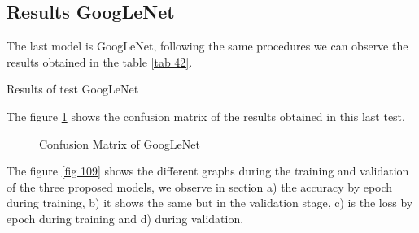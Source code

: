 \documentclass[letterpaper,12pt,openright,oneside]{article}
\begin{document}




\subsection{Results GoogLeNet}
The last model is GoogLeNet, following the same procedures we can observe the results obtained in the table \ref{tab 42}.\\

\begin{table}[H]
\centerline{}
\caption{Results of test GoogLeNet}
\label{tab 42}
\end{table}

The figure \ref{fig 108} shows the confusion matrix of the results obtained in this last test.\\

\begin{figure}[H]
\centerline{}
\caption{Confusion Matrix of GoogLeNet}
\label{fig 108}
\end{figure}

The figure \ref{fig 109} shows the different graphs during the training and validation of the three proposed models, we observe in section a) the accuracy by epoch during training, b) it shows the same but in the validation stage, c) is the loss by epoch during training and d) during validation.\\
\end{document}
